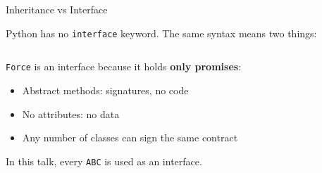 \begin{frame}[fragile]{Inheritance vs Interface}

    Python has no \texttt{interface} keyword. The same syntax means two things:

    \vfill
    \inputminted{python}{code/refresher/same_syntax.py}
    \vfill

    \pause

    \texttt{Force} is an interface because it holds \textbf{only promises}:
    \begin{itemize}
        \item Abstract methods: signatures, no code
        \item No attributes: no data
        \item Any number of classes can sign the same contract
    \end{itemize}

    \begin{center}
    \small In this talk, every \texttt{ABC} is used as an interface.
    \end{center}
\end{frame}
